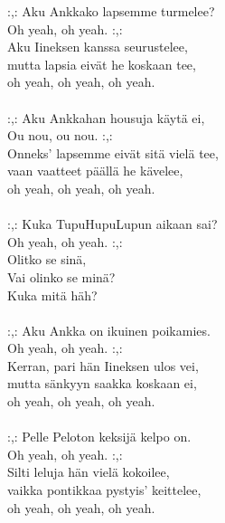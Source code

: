 
            :,: Aku Ankkako lapsemme turmelee? \\
            Oh yeah, oh yeah. :,: \\
            Aku Iineksen kanssa seurustelee, \\
            mutta lapsia eivät he koskaan tee, \\
            oh yeah, oh yeah, oh yeah. \\
\hspace{10mm} \\
            :,: Aku Ankkahan housuja käytä ei, \\
            Ou nou, ou nou. :,: \\
            Onneks’ lapsemme eivät sitä vielä tee, \\
            vaan vaatteet päällä he kävelee, \\
            oh yeah, oh yeah, oh yeah. \\
\hspace{10mm} \\
            :,: Kuka TupuHupuLupun aikaan sai? \\
            Oh yeah, oh yeah. :,: \\
            Olitko se sinä, \\
            Vai olinko se minä? \\
            Kuka mitä häh? \\
\hspace{10mm} \\
            :,: Aku Ankka on ikuinen poikamies. \\
            Oh yeah, oh yeah. :,: \\
            Kerran, pari hän Iineksen ulos vei, \\
            mutta sänkyyn saakka koskaan ei, \\
            oh yeah, oh yeah, oh yeah. \\
\hspace{10mm} \\
            :,: Pelle Peloton keksijä kelpo on. \\
            Oh yeah, oh yeah. :,: \\
            Silti leluja hän vielä kokoilee, \\
            vaikka pontikkaa pystyis’ keittelee, \\
            oh yeah, oh yeah, oh yeah. \\
\hspace{10mm} \\
